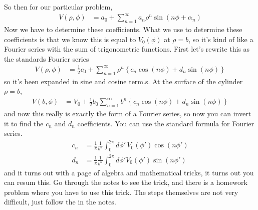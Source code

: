 So then for our particular problem,
\begin{align}
    V\left( \rho, \phi \right)
    &=
    a_0
    +
    \sum_{n=1}^{\infty}
    a_n \rho^n \sin\left( n\phi + \alpha_n \right)
\end{align}
Now we have to determine these coefficients.
What we use to determine these coefficients is that we know
this is equal to $V_0(\phi)$ at $\rho = b$,
so it's kind of like a Fourier series with the sum of trigonometric functions.
First let's rewrite this as the standards Fourier series
\begin{align}
    V\left( \rho, \phi \right)
    &=
    \frac{1}{2} c_0
    +
    \sum_{n=1}^{\infty}
    \rho^n\left\{ 
    c_n \cos\left( n\phi \right)
    +
    d_n \sin\left( n\phi \right)
    \right\}
\end{align}
so it's been expanded in sine and cosine term.s.
At the surface of the cylinder $\rho=b$,
\begin{align}
    V\left( b, \phi \right)
    &=
    V_0
    +
    \frac{1}{2} b_0
    \sum_{n=1}^{\infty}
    b^n
    \left\{ 
    c_n \cos\left( n\phi \right)
    + d_n \sin\left( n\phi \right)
    \right\}
\end{align}
and now this really is exactly the form of a Fourier series,
so now you can invert it to find the $c_n$ and $d_n$ coefficients.
You can use the standard formula for Fourier series.
\begin{align}
    c_n &=
    \frac{1}{\pi}
    \frac{1}{b^n}
    \int_{0}^{2\pi}
    d\phi'\,
    V_0\left( \phi' \right)
    \cos\left( n\phi' \right)\\
    d_n &=
    \frac{1}{\pi}
    \frac{1}{b^n}
    \int_{0}^{2\pi}
    d\phi'
    V_0\left( \phi' \right)
    \sin\left( n\phi' \right)
\end{align}
and it turns out with a page of algebra and mathematical tricks,
it turns out you can resum this.
Go through the notes to see the trick,
and there is a homework problem where you have to use this trick.
The steps themselves are not very difficult,
just follow the in the notes.
